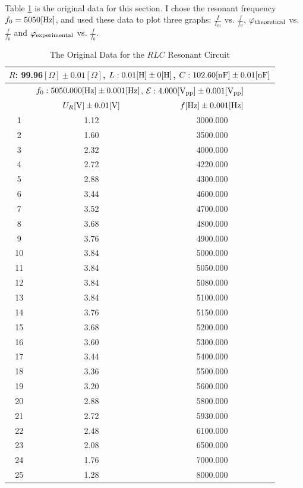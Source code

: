 \documentclass{my_template}
\renewcommand{\phi}{\varphi}
\newcommand{\e}{\mathcal{E}}
\begin{document}
    \paragraph{} Table \ref{tab:RLC Resonant} is the original data for this section. I chose the resonant frequency $f_0=5050[\rm Hz]$, and used these data to plot three graphs: $\frac{I}{I_m}$ vs. $\frac{f}{f_0}$, $\phi_{\rm theoretical}$ vs. $\frac{f}{f_0}$ and $\phi_{\rm experimental}$ vs. $\frac{f}{f_0}$.
    \begin{table}[H]
        \centering
        \begin{tabular}{|c|c|c|}
            \hline
            \multicolumn{3}{|c|}{$R$: 99.96$[\Omega]\pm 0.01[\Omega]$, $L: 0.01\rm [H]\pm 0[H]$, $C: 102.60\rm [nF]\pm 0.01[nF]$}\\\hline
            \multicolumn{3}{|c|}{$f_0: 5050.000[\rm Hz]\pm 0.001[Hz]$, $\e: 4.000[\rm V_{pp}]\pm 0.001[V_{pp}]$}\\\hline
            &$U_R[\rm V]\pm 0.01[V]$&$f\rm[Hz]\pm 0.001[Hz]$\\\hline
            1&1.12&3000.000\\\hline
            2&1.60&3500.000\\\hline
            3&2.32&4000.000\\\hline
            4&2.72&4220.000\\\hline
            5&2.88&4300.000\\\hline
            6&3.44&4600.000\\\hline
            7&3.52&4700.000\\\hline
            8&3.68&4800.000\\\hline
            9&3.76&4900.000\\\hline
            10&3.84&5000.000\\\hline
            11&3.84&5050.000\\\hline
            12&3.84&5080.000\\\hline
            13&3.84&5100.000\\\hline
            14&3.76&5150.000\\\hline
            15&3.68&5200.000\\\hline
            16&3.60&5300.000\\\hline
            17&3.44&5400.000\\\hline
            18&3.36&5500.000\\\hline
            19&3.20&5600.000\\\hline
            20&2.88&5800.000\\\hline
            21&2.72&5930.000\\\hline
            22&2.48&6100.000\\\hline
            23&2.08&6500.000\\\hline
            24&1.76&7000.000\\\hline
            25&1.28&8000.000\\\hline
        \end{tabular}
        \caption{The Original Data for the $RLC$ Resonant Circuit}
        \label{tab:RLC Resonant}
    \end{table}
    \vspace{-5mm}
\end{document}
